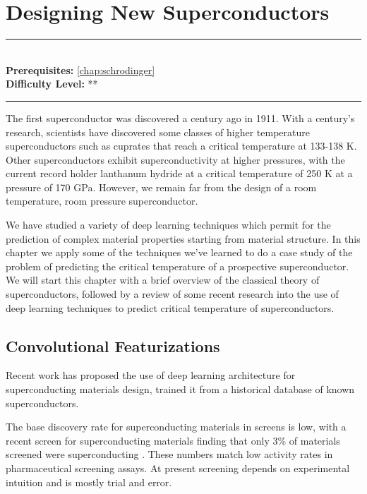 \documentclass[book.tex]{subfiles}
\begin{document}
\chapter{Designing New Superconductors}

\label{chap:designing_superconductors}
\noindent\rule{11cm}{0.4pt} \\
\textbf{Prerequisites:}  \autoref{chap:schrodinger} \\
\textbf{Difficulty Level:} ** \\
\noindent\rule{11cm}{0.4pt}
\vspace{5mm}

The first superconductor was discovered a century ago in 1911. With a century's research, scientists have discovered some classes of higher temperature superconductors such as cuprates that reach a critical temperature at 133-138 K. Other superconductors exhibit superconductivity at higher pressures, with the current record holder lanthanum hydride at a critical temperature of 250 K at a pressure of 170 GPa. However, we remain far from the design of a room temperature, room pressure superconductor.

We have studied a variety of deep learning techniques which permit for the prediction of complex material properties starting from material structure. In this chapter we apply some of the techniques we've learned to do a case study of the problem of predicting the critical temperature of a prospective superconductor. We will start this chapter with a brief overview of the classical theory of superconductors, followed by a review of some recent research into the use of deep learning techniques to predict critical temperature of superconductors.


\section{Convolutional Featurizations}
Recent work \cite{konno2018deep} has proposed the use of deep learning architecture for superconducting materials design, trained it from a historical database of known superconductors. %

The base discovery rate for superconducting materials in screens is low, with a recent screen for superconducting materials finding that only 3\% of materials screened were superconducting \cite{konno2018deep}. These numbers match low activity rates in pharmaceutical screening assays. At present screening depends on experimental intuition and is mostly trial and error. %
\end{document}
